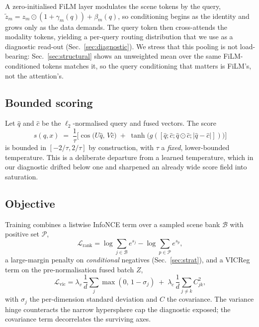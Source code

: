 \documentclass[10pt,twocolumn,letterpaper]{article}
\begin{document}
A zero-initialised FiLM layer modulates the scene tokens by the query,
$\tilde{z}_m = z_m\odot(1+\gamma_m(q)) + \beta_m(q)$, so conditioning
begins as the identity and grows only as the data demands. The query token
then cross-attends the modality tokens, yielding a per-query routing
distribution that we use as a diagnostic read-out
(Sec.~\ref{sec:diagnostic}). We stress that this pooling is not load-bearing:
Sec.~\ref{sec:structural} shows an unweighted mean over the same
FiLM-conditioned tokens matches it, so the query conditioning that matters is
FiLM's, not the attention's.

\subsection{Bounded scoring}
Let $\hat q$ and $\hat c$ be the $\ell_2$-normalised query and fused
vectors. The score
\begin{equation}
s(q,x) \;=\; \frac{1}{\tau}\Big[\cos\!\big(U\hat q,\,V\hat c\big)
\;+\; \tanh\!\big(g([\hat q;\hat c;\hat q\!\odot\!\hat c;|\hat q\!-\!\hat c|])\big)\Big]
\label{eq:score}
\end{equation}
is bounded in $[-2/\tau, 2/\tau]$ by construction, with $\tau$ a
\emph{fixed}, lower-bounded temperature. This is a deliberate departure
from a learned temperature, which in our diagnostic drifted below one and
sharpened an already wide score field into saturation.

\subsection{Objective}
Training combines a listwise InfoNCE term \cite{cpc} over a sampled scene bank
$\mathcal{B}$ with positive set $\mathcal{P}$,
\begin{equation}
\mathcal{L}_{\text{rank}}
= \log\!\!\sum_{j\in\mathcal{B}}\!e^{s_j}
- \log\!\!\sum_{p\in\mathcal{P}}\!e^{s_p},
\end{equation}
a large-margin penalty on \emph{conditional} negatives (Sec.~\ref{sec:strat}),
and a VICReg term on the pre-normalisation fused batch $Z$,
\begin{equation}
\mathcal{L}_{\text{vic}}
= \lambda_v\,\frac{1}{d}\sum_{j}\max(0,\,1-\sigma_j)
\;+\;\lambda_c\,\frac{1}{d}\sum_{j\neq k} C_{jk}^{2},
\label{eq:vicreg}
\end{equation}
with $\sigma_j$ the per-dimension standard deviation and $C$ the
covariance. The variance hinge counteracts the narrow hypersphere cap the
diagnostic exposed; the covariance term decorrelates the surviving axes.
\end{document}
